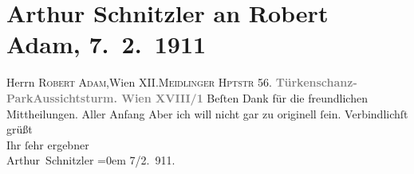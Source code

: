 

         
         \renewcommand{\erwaehntePersonen}{Personen: Robert Adam}
         \renewcommand{\erwaehnteOrte}{Orte: IX., Alsergrund, Meidlinger Hauptstraße, Türkenschanzpark, Wien, XII., Meidling, XVIII., Währing}
         \renewcommand{\erwaehnteWerke}{}
               \section[Arthur Schnitzler an Robert Adam, 7. 2. 1911]{ Arthur Schnitzler an Robert Adam, 7. 2. 1911}\nopagebreak{}\rehead{ }\begin{ledgroupsized}[t]{13cm}\normalsize\beginnumbering \toendnotes[C]{\smallbreak\pagebreak[2]} 
\pstart{}{\pb}Herrn \textsc{Robert
                        Adam},\pend{}\pstart{}Wien XII.\pend{}\pstart{}\textsc{Meidlinger Hptstr} 56.\pend{}{\bigskip}\pstart
           \noindent{}\centering{}{\pb}\textcolor{gray}{\textbf{Türkenschanz-ParkAussichtsturm. Wien XVIII/1}}\pend
           \pstart
           {\pb}Beſten Dank für die freundlichen Mittheilungen. Aller
                    Anfang {\dotsfour} Aber ich will nicht gar zu originell
                    ſein.\pend
           \pstart
           Verbindlichſt grüßt{\\[\baselineskip]}Ihr ſehr ergebner{\\[\baselineskip]}\spacefill\mbox{Arthur Schnitzler}\pend
           \leftskip=0em{}\pstart
           \raggedleft{}7/2. 911.\pend
           
         
         \endnumbering{}\end{ledgroupsized}  \newcommand{\dateiname}{L02004}\newcommand{\titel}{Arthur Schnitzler an Robert Adam, 7. 2. 1911}\newcommand{\editorInnen}{Martin Anton Müller und Gerd-Hermann Susen}
      